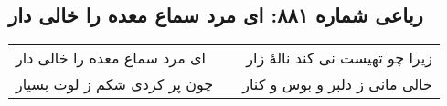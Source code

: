 \begin{center}
\section*{رباعی شماره ۸۸۱: ای مرد سماع معده را خالی دار}
\label{sec:0881}
\begin{longtable}{l p{0.5cm} r}
ای مرد سماع معده را خالی دار
&&
زیرا چو تهیست نی کند نالهٔ زار
\\
چون پر کردی شکم ز لوت بسیار
&&
خالی مانی ز دلبر و بوس و کنار
\\
\end{longtable}
\end{center}
